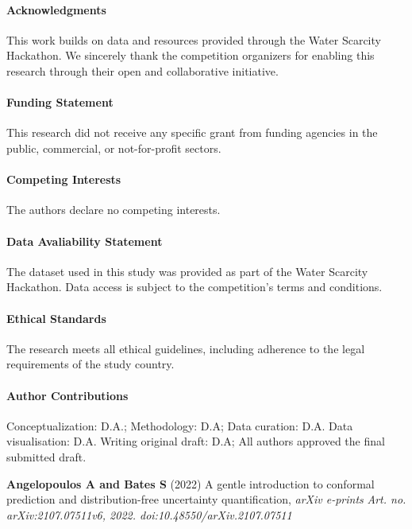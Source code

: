 \documentclass[ruler]{CUP-JNL-EDS}%
\begin{document}
\begin{Backmatter}
\paragraph{Acknowledgments}
This work builds on data and resources provided through the Water Scarcity Hackathon. We sincerely thank 
the competition organizers for enabling this research through their open and collaborative initiative.

\paragraph{Funding Statement}
This research did not receive any specific grant from funding agencies in the public, commercial, 
or not-for-profit sectors.

\paragraph{Competing Interests}
The authors declare no competing interests.

\paragraph{Data Avaliability Statement}
The dataset used in this study was provided as part of the Water Scarcity Hackathon. Data access is subject 
to the competition’s terms and conditions. 

\paragraph{Ethical Standards}
The research meets all ethical guidelines, including adherence to the legal requirements of the study country.

\paragraph{Author Contributions}
Conceptualization: D.A.; Methodology: D.A; Data curation: D.A. Data visualisation: D.A. Writing original draft: D.A; All authors approved the final submitted draft.

\begin{thebibliography}{}

\textbf{Angelopoulos A and Bates S} (2022) A gentle introduction to conformal prediction and distribution-free uncertainty quantification, \textit{arXiv e-prints} \textit{Art. no. arXiv:2107.07511v6, 2022. doi:10.48550/arXiv.2107.07511}


\end{thebibliography}
\end{Backmatter}
\end{document}
